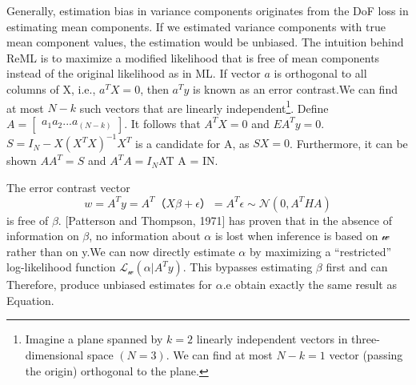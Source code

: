 \documentclass[a4paper,11pt]{article}
\begin{document}
Generally, estimation bias in variance components originates from the DoF loss in estimating mean components. If we estimated variance components with true mean component values, the estimation would be unbiased. 
The intuition behind ReML is to maximize a modified likelihood that is free of mean components instead of the original likelihood as in ML.
If vector $a$ is orthogonal to all columns of X, i.e., $a^T X = 0 $, then $a^T y$ is known as an error contrast.We can find at most $N-k$ such vectors that are linearly independent\footnote{ Imagine a plane spanned by $k = 2$ linearly independent vectors in three-dimensional space $(N = 3)$. We can find at most $N - k = 1$ vector (passing the origin) orthogonal to the plane.}. Define $A =\begin{bmatrix} a_1 a_2 ... a_(N-k) \end{bmatrix}$. It follows that $A^T X = 0$ and $E{A^T y} = 0$. $S = I_N - X(X^T X)^{-1} X^T $ is a candidate for A, as $SX = 0$. Furthermore, it can be shown $A A^T = S$ and $A^T A = I_N$AT A = IN.

The error contrast vector 
\begin{equation}\label{eq1} 
         w = A^T y = A^T（X \beta + \epsilon）= A^T \epsilon \sim \mathcal{N}(0,A^T H A)
\end{equation}
 is free of $\beta$. [Patterson and Thompson, 1971] has proven that in the absence of information on $\beta$, no information about $\alpha$ is lost when inference is based on $\mathcal{w}$ rather than on y.We can now directly estimate $\alpha$ by maximizing a “restricted” log-likelihood function $\mathcal{L_w}(\alpha| A^T y)$. This bypasses estimating $\beta$ first and can Therefore, produce unbiased estimates for $\alpha$.e obtain exactly the same result as Equation.
\end{document}
